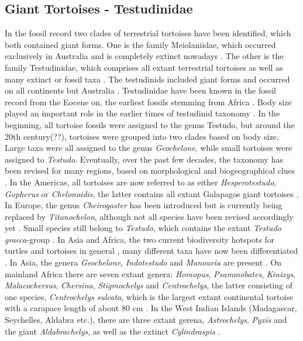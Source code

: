 \subsection{Giant Tortoises - Testudinidae}
In the fossil record two clades of terrestrial tortoises have been identified, which both contained giant forms. One is the family Meiolaniidae, which occurred exclusively in Australia and is completely extinct nowadays \citep{.}. The other is the family Testudinidae, which comprises all extant terrestrial tortoises as well as many extinct or fossil taxa \citep{.}. The testudinids included giant forms and occurred on all continents but Australia \citep{.}.
Testudinidae have been known in the fossil record from the Eocene on, the earliest fossils stemming from Africa \citep{.}.
Body size played an important role in the earlier times of testudinid taxonomy \citep{.}. In the beginning, all tortoise fossils were assigned to the genus Testudo, but around the 20th century(??), tortoises were grouped into two clades based on body size. Large taxa were all assigned to the genus \textit{Geochelone}, while small tortoises were assigned to \textit{Testudo}.
Eventually, over the past few decades, the taxonomy has been revised for many regions, based on morphological and biogeographical clues \citep{.}. In the Americas, all tortoises are now referred to as either \textit{Hesperotestudo}, \textit{Gopherus} or \textit{Chelonoidis}, the latter contains all extant Galapagos giant tortoises \citep{.}. In Europe, the genus \textit{Cheirogaster} has been introduced but is currently being replaced by \textit{Titanochelon}, although not all species have been revised accordingly yet \citep{.}. Small species still belong to \textit{Testudo}, which contains the extant \textit{Testudo graeca}-group \citep{.}.
In Asia and Africa, the two current biodiversity hotspots for turtles and tortoises in general \citep{.}, many different taxa have now been differentiated \citep{.}.
In Asia, the genera \textit{Geochelone}, \textit{Indotestudo} and \textit{Manouria} are present \citep{.}. On mainland Africa there are seven extant genera: \textit{Homopus}, \textit{Psammobates}, \textit{Kinixys}, \textit{Malacochersus}, \textit{Chersina}, \textit{Stigmochelys} and \textit{Centrochelys}, the latter consisting of one species, \textit{Centrochelys sulcata}, which is the largest extant continental tortoise with a carapace length of about 80 cm \citep{.}. In the West Indian Islands (Madagascar, Seychelles, Aldabra etc.), there are three extant gerena, \textit{Astrochelys}, \textit{Pyxis} and the giant \textit{Aldabrachelys}, as well as the extinct \textit{Cylindraspis} \citep{.}.

